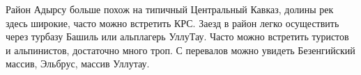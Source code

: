     Район Адырсу больше похож на типичный Центральный Кавказ, долины рек здесь широкие, часто можно встретить КРС. Заезд в район легко осуществить через турбазу Башиль или альплагерь УллуТау. Часто можно встретить туристов и альпинистов, достаточно много троп. С перевалов можно увидеть Безенгийский массив, Эльбрус, массив Уллутау.
    
    
